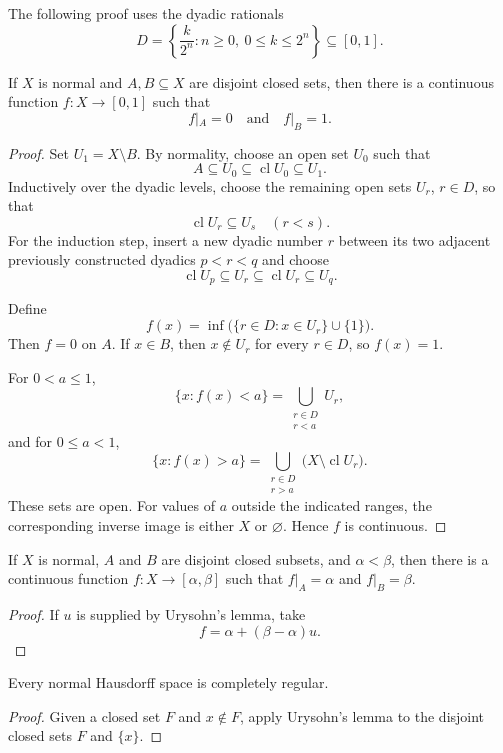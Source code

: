 The following proof uses the dyadic rationals
\[
D=\left\{\frac{k}{2^n}:n\geq0,\ 0\leq k\leq2^n\right\}\subseteq[0,1].
\]

\begin{thm}
If $X$ is normal and $A,B\subseteq X$ are disjoint closed sets, then there is
a continuous function $f:X\to[0,1]$ such that
\[
f|_A=0
\quad\text{and}\quad
f|_B=1.
\]
\end{thm}

\begin{proof}
Set $U_1=X\setminus B$. By normality, choose an open set $U_0$ such
that
\[
A\subseteq U_0\subseteq\operatorname{cl}U_0\subseteq U_1.
\]
Inductively over the dyadic levels, choose the remaining open sets $U_r$,
$r\in D$, so that
\[
\operatorname{cl}U_r\subseteq U_s\quad(r<s).
\]
For the induction step, insert a new dyadic number $r$ between its two
adjacent previously constructed dyadics $p<r<q$ and choose
\[
\operatorname{cl}U_p\subseteq U_r
\subseteq\operatorname{cl}U_r\subseteq U_q.
\]

Define
\[
f(x)=\inf\bigl(\{r\in D:x\in U_r\}\cup\{1\}\bigr).
\]
Then $f=0$ on $A$. If $x\in B$, then $x\notin U_r$ for every $r\in D$, so
$f(x)=1$.

For $0<a\leq1$,
\[
\{x:f(x)<a\}=\bigcup_{\substack{r\in D\\r<a}}U_r,
\]
and for $0\leq a<1$,
\[
\{x:f(x)>a\}
=
\bigcup_{\substack{r\in D\\r>a}}
\bigl(X\setminus\operatorname{cl}U_r\bigr).
\]
These sets are open. For values of $a$ outside the indicated ranges, the
corresponding inverse image is either $X$ or $\varnothing$. Hence $f$ is
continuous.
\end{proof}

\begin{cor}
If $X$ is normal, $A$ and $B$ are disjoint closed subsets, and
$\alpha<\beta$, then there is a continuous function
$f:X\to[\alpha,\beta]$ such that $f|_A=\alpha$ and $f|_B=\beta$.
\end{cor}

\begin{proof}
If $u$ is supplied by Urysohn's lemma, take
\[
f=\alpha+(\beta-\alpha)u.
\]
\end{proof}

\begin{thm}
Every normal Hausdorff space is completely regular.
\end{thm}

\begin{proof}
Given a closed set $F$ and $x\notin F$, apply Urysohn's lemma to the disjoint
closed sets $F$ and $\{x\}$.
\end{proof}

